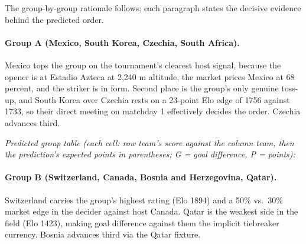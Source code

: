 \documentclass[11pt,letterpaper]{article}
\begin{document}
The group-by-group rationale follows; each paragraph states the decisive evidence behind the predicted order.

\paragraph{Group A (Mexico, South Korea, Czechia, South Africa).} Mexico tops the group on the tournament's clearest host signal, because the opener is at Estadio Azteca at 2{,}240 m altitude, the market prices Mexico at 68 percent, and the striker is in form. Second place is the group's only genuine toss-up, and South Korea over Czechia rests on a 23-point Elo edge of 1756 against 1733, so their direct meeting on matchday 1 effectively decides the order. Czechia advances third.

\noindent\textit{\footnotesize Predicted group table (each cell: row team's score against the column team, then the prediction's expected points in parentheses; G = goal difference, P = points):}



\paragraph{Group B (Switzerland, Canada, Bosnia and Herzegovina, Qatar).} Switzerland carries the group's highest rating (Elo 1894) and a 50\% vs.\ 30\% market edge in the decider against host Canada. Qatar is the weakest side in the field (Elo 1423), making goal difference against them the implicit tiebreaker currency. Bosnia advances third via the Qatar fixture.
\end{document}
